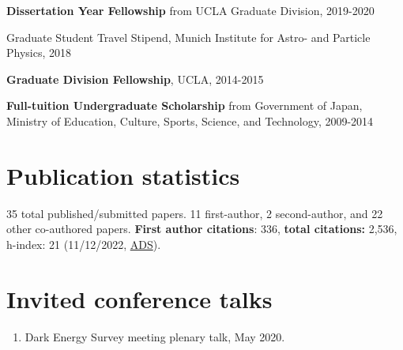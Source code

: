 \documentclass[margin, line]{res}
\begin{document}
\begin{resume}
\vspace*{-2.5mm}
\textbf{Dissertation Year Fellowship} from UCLA Graduate Division, 2019-2020%

\vspace*{-2.5mm}
Graduate Student Travel Stipend, {Munich Institute for Astro- and Particle Physics}, 2018%


\vspace*{-2.5mm}
\textbf{Graduate Division Fellowship}, UCLA, 2014-2015%

\vspace*{-2.5mm}
\textbf{Full-tuition Undergraduate Scholarship} from {Government of Japan, Ministry of Education, Culture, Sports, Science, and Technology}, 2009-2014%

\section{\sc Publication statistics} 35 total published/submitted papers. {11 first-author}, {2 second-author, and 22 other co-authored} papers. \textbf{First author citations}: 336, \textbf{total citations:} 2,536, h-index: 21 (11/12/2022, \href{https://ui.adsabs.harvard.edu/user/libraries/NYgiA71JS4CR85Tt8CgJsw}{ADS}).
\vspace*{2.5mm}

\section{\sc Invited conference talks}
\begin{enumerate}

	\item Dark Energy Survey meeting plenary talk, May 2020.	 %
\end{enumerate}


\end{resume}
\end{document}
